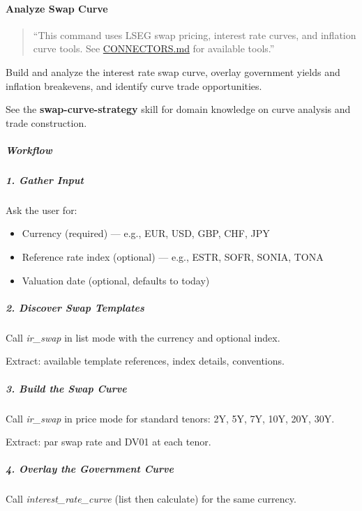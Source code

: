\documentclass[11pt]{article}
\begin{document}
\paragraph{Analyze Swap Curve}\mbox{}\par

\begin{quote}
``This command uses LSEG swap pricing, interest rate curves, and inflation curve tools. See \href{../CONNECTORS.md}{CONNECTORS.md} for available tools.''
\end{quote}

Build and analyze the interest rate swap curve, overlay government yields and inflation breakevens, and identify curve trade opportunities.


See the \textbf{swap-curve-strategy} skill for domain knowledge on curve analysis and trade construction.


\subparagraph{Workflow}\mbox{}\par

\subparagraph{1. Gather Input}\mbox{}\par

Ask the user for:

\begin{itemize}[leftmargin=*,itemsep=2pt,topsep=2pt]
\item {} Currency (required) — e.g., EUR, USD, GBP, CHF, JPY
\item {} Reference rate index (optional) — e.g., ESTR, SOFR, SONIA, TONA
\item {} Valuation date (optional, defaults to today)
\end{itemize}

\subparagraph{2. Discover Swap Templates}\mbox{}\par

Call \emph{ir\_\allowbreak{}swap} in list mode with the currency and optional index.


Extract: available template references, index details, conventions.


\subparagraph{3. Build the Swap Curve}\mbox{}\par

Call \emph{ir\_\allowbreak{}swap} in price mode for standard tenors: 2Y, 5Y, 7Y, 10Y, 20Y, 30Y.


Extract: par swap rate and DV01 at each tenor.


\subparagraph{4. Overlay the Government Curve}\mbox{}\par

Call \emph{interest\_\allowbreak{}rate\_\allowbreak{}curve} (list then calculate) for the same currency.
\end{document}

